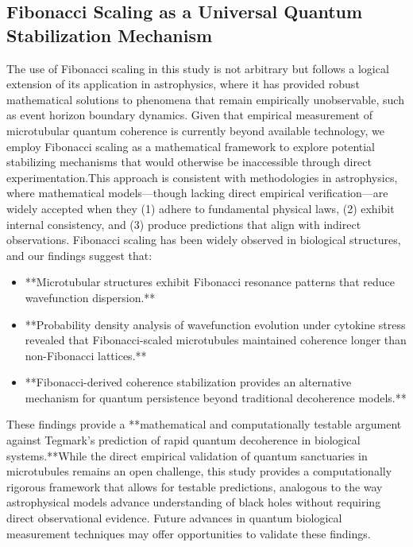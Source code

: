 \documentclass[entropy,article,submit,oneauthor,pdftex,]{Definitions/mdpi}
\begin{document}
\subsection{Fibonacci Scaling as a Universal Quantum Stabilization Mechanism}
The use of Fibonacci scaling in this study is not arbitrary but follows a logical extension of its application in astrophysics, where it has provided robust mathematical solutions to phenomena that remain empirically unobservable, such as event horizon boundary dynamics. Given that empirical measurement of microtubular quantum coherence is currently beyond available technology, we employ Fibonacci scaling as a mathematical framework to explore potential stabilizing mechanisms that would otherwise be inaccessible through direct experimentation.This approach is consistent with methodologies in astrophysics, where mathematical models—though lacking direct empirical verification—are widely accepted when they (1) adhere to fundamental physical laws, (2) exhibit internal consistency, and (3) produce predictions that align with indirect observations. 
Fibonacci scaling has been widely observed in biological structures, and our findings suggest that:
\begin{itemize}
\item **Microtubular structures exhibit Fibonacci resonance patterns that reduce wavefunction dispersion.**
\item **Probability density analysis of wavefunction evolution under cytokine stress revealed that Fibonacci-scaled microtubules maintained coherence longer than non-Fibonacci lattices.**
\item **Fibonacci-derived coherence stabilization provides an alternative mechanism for quantum persistence beyond traditional decoherence models.**
\end{itemize}
These findings provide a **mathematical and computationally testable argument against Tegmark’s prediction of rapid quantum decoherence in biological systems.**While the direct empirical validation of quantum sanctuaries in microtubules remains an open challenge, this study provides a computationally rigorous framework that allows for testable predictions, analogous to the way astrophysical models advance understanding of black holes without requiring direct observational evidence. Future advances in quantum biological measurement techniques may offer opportunities to validate these findings.
\end{document}
